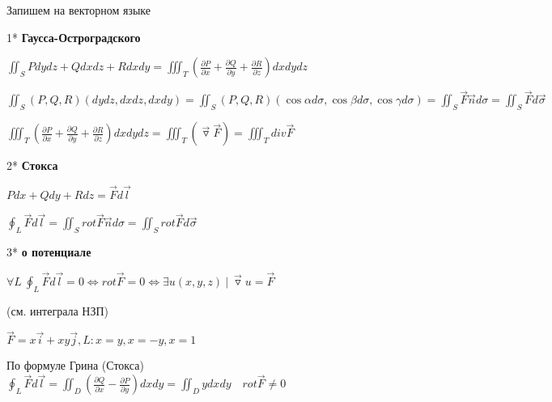 \documentclass[12pt]{article}
\begin{document}
    \Nota Запишем \Ths на векторном языке

    \hypertarget{theoremGaussOstrogradskyyinvectorform}{}

    1* \textbf{Гаусса-Остроградского}

    $\iint_S Pdydz + Qdxdz + Rdxdy = \iiint_T \left(\frac{\partial P}{\partial x} + \frac{\partial Q}{\partial y} + \frac{\partial R}{\partial z}\right) dxdydz$

    $\iint_S (P, Q, R) (dydz, dxdz, dxdy) = \iint_S (P, Q, R) (\cos\alpha d\sigma, \cos\beta d\sigma, \cos\gamma d\sigma) =
    \iint_S \overrightarrow{F} \overrightarrow{n} d\sigma = \iint_S \overrightarrow{F} d\overrightarrow{\sigma}$

    $\iiint_T \left(\frac{\partial P}{\partial x} + \frac{\partial Q}{\partial y} + \frac{\partial R}{\partial z}\right) dxdydz = \iiint_T (\overrightarrow{\triangledown} \overrightarrow{F}) = \iiint_T div \overrightarrow{F}$


    \mediumvspace

    \hypertarget{theoremStokesinvectorform}{}

    2* \textbf{Стокса}

    $Pdx + Qdy + Rdz = \overrightarrow{F}d\overrightarrow{l}$

    $\oint_L \overrightarrow{F}d\overrightarrow{l} = \iint_S rot \overrightarrow{F} \overrightarrow{n} d\sigma = \iint_S rot \overrightarrow{F} d\overrightarrow{\sigma}$

    \mediumvspace

    \hypertarget{theoremaboutpotentialinvectorform}{}

    3* \textbf{\Ths о потенциале}

    $\forall L \ \oint_L \overrightarrow{F}d\overrightarrow{l} = 0 \Longleftrightarrow rot \overrightarrow{F} = 0 \Longleftrightarrow \exists u(x, y, z) \ | \ \overrightarrow{\triangledown} u = \overrightarrow{F}$

    (см. \Ths интеграла НЗП)

    \Ex $\overrightarrow{F} = x\overrightarrow{i} + xy \overrightarrow{j}, L: x = y, x = -y, x = 1$

    По формуле Грина (Стокса) $\oint_L \overrightarrow{F} d\overrightarrow{l} = \iint_{D} \left(\frac{\partial Q}{\partial x} - \frac{\partial P}{\partial y}\right) dxdy =
    \iint_D y dxdy \quad rot \overrightarrow{F} \neq 0$
\end{document}
